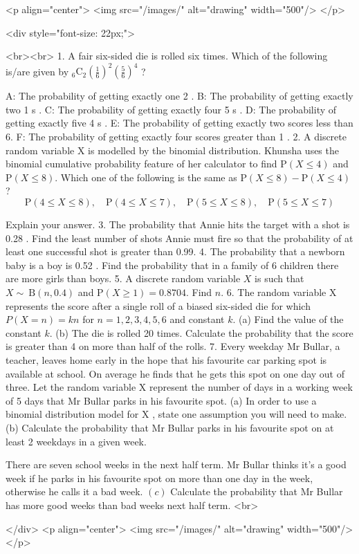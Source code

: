 <p align="center">
<img src="/images/" alt="drawing" width="500"/>
</p>

<div style="font-size: 22px;">

<br><br>
1. A fair six-sided die is rolled six times. Which of the following is/are given by ${ }_{6} \mathrm{C}_{2}\left(\frac{1}{6}\right)^{2}\left(\frac{5}{6}\right)^{4}$ ?

A: The probability of getting exactly one 2 .
B: The probability of getting exactly two 1 s .
C: The probability of getting exactly four 5 s .
D: The probability of getting exactly five 4 s .
E: The probability of getting exactly two scores less than 6.
F: The probability of getting exactly four scores greater than 1 .
2. A discrete random variable X is modelled by the binomial distribution. Khunsha uses the binomial cumulative probability feature of her calculator to find $\mathrm{P}(X \leq 4)$ and $\mathrm{P}(X \leq 8)$.
Which one of the following is the same as $\mathrm{P}(X \leq 8)-\mathrm{P}(X \leq 4)$ ?
$$
\mathrm{P}(4 \leq X \leq 8), \quad \mathrm{P}(4 \leq X \leq 7), \quad \mathrm{P}(5 \leq X \leq 8), \quad \mathrm{P}(5 \leq X \leq 7)
$$

Explain your answer.
3. The probability that Annie hits the target with a shot is 0.28 . Find the least number of shots Annie must fire so that the probability of at least one successful shot is greater than 0.99.
4. The probability that a newborn baby is a boy is 0.52 . Find the probability that in a family of 6 children there are more girls than boys.
5. A discrete random variable $X$ is such that $X \sim \mathrm{~B}(n, 0.4)$ and $\mathrm{P}(X \geq 1)=0.8704$. Find $n$.
6. The random variable X represents the score after a single roll of a biased six-sided die for which $P(X=n)=k n$ for $n=1,2,3,4,5,6$ and constant $k$.
(a) Find the value of the constant $k$.
(b) The die is rolled 20 times. Calculate the probability that the score is greater than 4 on more than half of the rolls.
7. Every weekday Mr Bullar, a teacher, leaves home early in the hope that his favourite car parking spot is available at school. On average he finds that he gets this spot on one day out of three. Let the random variable X represent the number of days in a working week of 5 days that Mr Bullar parks in his favourite spot.
(a) In order to use a binomial distribution model for X , state one assumption you will need to make.
(b) Calculate the probability that Mr Bullar parks in his favourite spot on at least 2 weekdays in a given week.

There are seven school weeks in the next half term. Mr Bullar thinks it's a good week if he parks in his favourite spot on more than one day in the week, otherwise he calls it a bad week.
\((c)\) Calculate the probability that Mr Bullar has more good weeks than bad weeks next half term.
<br>

</div>
<p align="center">
<img src="/images/" alt="drawing" width="500"/>
</p>
